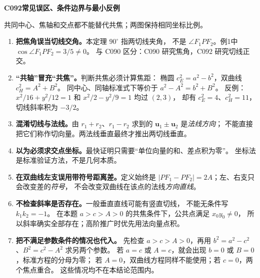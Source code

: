 \clearpage
\begin{trapbox}
\textbf{C092\quad 常见误区、条件边界与最小反例}
\begin{center}


{\small 共同中心、焦轴和交点都不能替代共焦；两图保持相同坐标比例。}
\end{center}
\begin{enumerate}
\item \textbf{把焦角误当切线交角。}本定理 $90^\circ$ 指两切线夹角，
不是 $\angle F_1PF_2$。例1中 $\cos\angle F_1PF_2=3/5\ne0$。
与 C090 区分：C090 研究焦角，C092 研究切线正交。

\item \textbf{“共轴”冒充“共焦”。}判断共焦必须计算焦距：
椭圆 $c_E^2=a^2-b^2$，双曲线 $c_H^2=A^2+B^2$。
同中心、同轴标准式下等价于 $a^2-A^2=b^2+B^2$。
反例：$x^2/16+y^2/12=1$ 和 $x^2/2-y^2/9=1$ 均过 $(2,3)$，
却有 $c_E^2=4$、$c_H^2=11$，切线斜率积为 $-3/2$。

\item \textbf{混淆切线与法线。}由 $r_1+r_2$、$r_1-r_2$ 求到的
$\mathbf u_1\pm\mathbf u_2$ 是\emph{法线方向}；
不能直接把它们称作切向量。两法线垂直最终才推出两切线垂直。

\item \textbf{以为必须求交点坐标。}最快证明只需要“单位向量的和、差点积为零”。
坐标法是标准验证方法，不是几何本质。

\item \textbf{在双曲线左支误用带符号距离差。}定义始终是
$|PF_1-PF_2|=2A$；左、右支只会改变差的\emph{符号}，
不会改变双曲线在该点的法线\emph{方向直线}。

\item \textbf{不检查斜率是否存在。}一般垂直直线可能有竖直切线，
不能无条件写 $k_1k_2=-1$。
在本题 $a>c>A>0$ 的共焦条件下，公共点满足 $x_0y_0\ne0$，
所以斜率确实全部存在；高阶推广时优先用法向量点积。

\item \textbf{把不满足参数条件的情况也代入。}
先检查 $a>c>A>0$，再用 $b^2=a^2-c^2$、$B^2=c^2-A^2$ 求另两个参数。
若 $a=c$ 或 $A=c$，就会出现 $b=0$ 或 $B=0$，标准方程的分母为零；
若 $A=0$，双曲线方程同样不能使用；若 $c=0$，两个焦点重合。
这些情况均不在本结论范围内。

\end{enumerate}
\end{trapbox}
\clearpage
